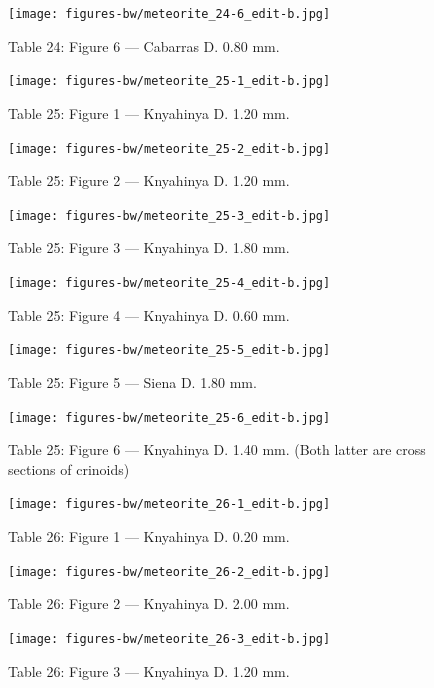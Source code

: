 \documentclass[a4paper, 12pt, oneside]{article}
\begin{document}
\clearpage
\begin{figure}[t]
\texttt{[image: figures-bw/meteorite\_24-6\_edit-b.jpg]}
\caption{Table 24: Figure 6 --- Cabarras D. 0.80 mm.}
\centering
\end{figure}
\clearpage
{}
\begin{figure}[t]
\texttt{[image: figures-bw/meteorite\_25-1\_edit-b.jpg]}
\caption{Table 25: Figure 1 --- Knyahinya D. 1.20 mm.}
\centering
\end{figure}
\clearpage
\begin{figure}[t]
\texttt{[image: figures-bw/meteorite\_25-2\_edit-b.jpg]}
\caption{Table 25: Figure 2 --- Knyahinya D. 1.20 mm.}
\centering
\end{figure}
\clearpage
\begin{figure}[t]
\texttt{[image: figures-bw/meteorite\_25-3\_edit-b.jpg]}
\caption{Table 25: Figure 3 --- Knyahinya D. 1.80 mm.}
\centering
\end{figure}
\clearpage
\begin{figure}[t]
\texttt{[image: figures-bw/meteorite\_25-4\_edit-b.jpg]}
\caption{Table 25: Figure 4 --- Knyahinya D. 0.60 mm.}
\centering
\end{figure}
\clearpage
\begin{figure}[t]
\texttt{[image: figures-bw/meteorite\_25-5\_edit-b.jpg]}
\caption{Table 25: Figure 5 --- Siena D. 1.80 mm.}
\centering
\end{figure}
\clearpage
\begin{figure}[t]
\texttt{[image: figures-bw/meteorite\_25-6\_edit-b.jpg]}
\caption{Table 25: Figure 6 --- Knyahinya D. 1.40 mm. (Both latter are cross sections of crinoids)}
\centering
\end{figure}
\clearpage
{}
\begin{figure}[t]
\texttt{[image: figures-bw/meteorite\_26-1\_edit-b.jpg]}
\caption{Table 26: Figure 1 --- Knyahinya D. 0.20 mm.}
\centering
\end{figure}
\clearpage
\begin{figure}[t]
\texttt{[image: figures-bw/meteorite\_26-2\_edit-b.jpg]}
\caption{Table 26: Figure 2 --- Knyahinya D. 2.00 mm.}
\centering
\end{figure}
\clearpage
\begin{figure}[t]
\texttt{[image: figures-bw/meteorite\_26-3\_edit-b.jpg]}
\caption{Table 26: Figure 3 --- Knyahinya D. 1.20 mm.}
\centering
\end{figure}
\end{document}
